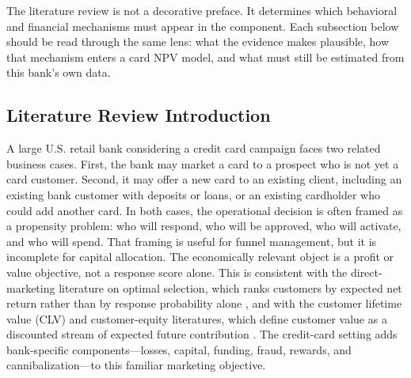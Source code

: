 \documentclass[11pt]{article}
\newcommand{\1}{\mathbf{1}}
\begin{document}
The literature review is not a decorative preface.  It determines which
behavioral and financial mechanisms must appear in the component.  Each
subsection below should be read through the same lens: what the evidence makes
plausible, how that mechanism enters a card NPV model, and what must still be
estimated from this bank's own data.

\subsection{Literature Review Introduction}

A large U.S. retail bank considering a credit card campaign faces two related
business cases. First, the bank may market a card to a prospect who is not yet a
card customer. Second, it may offer a new card to an existing client, including
an existing bank customer with deposits or loans, or an existing cardholder who
could add another card. In both cases, the operational decision is often framed
as a propensity problem: who will respond, who will be approved, who will
activate, and who will spend. That framing is useful for funnel management, but
it is incomplete for capital allocation. The economically relevant object is a
profit or value objective, not a response score alone. This is consistent with
the direct-marketing literature on optimal selection, which ranks customers by
expected net return rather than by response probability alone
\citep{bult1995directmail}, and with the customer lifetime value (CLV) and
customer-equity literatures, which define customer value as a discounted stream
of expected future contribution \citep{berger1998clv,rust2004return,venkatesan2004clv}.
The credit-card setting adds bank-specific components---losses, capital,
funding, fraud, rewards, and cannibalization---to this familiar marketing
objective.
\end{document}
